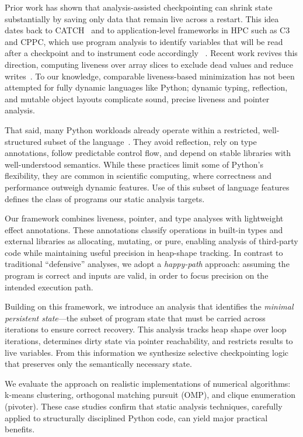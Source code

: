 Prior work has shown that analysis-assisted checkpointing can shrink state substantially by saving only data that remain live across a restart. This idea dates back to CATCH~\cite{li1990catch} and to application-level frameworks in HPC such as C3 and CPPC, which use program analysis to identify variables that will be read after a checkpoint and to instrument code accordingly ~\cite{bronevetsky2004application,rodriguez2010cppc}. Recent work revives this direction, computing liveness over array slices to exclude dead values and reduce writes~\cite{kim2024lact}. To our knowledge, comparable liveness-based minimization has not been attempted for fully dynamic languages like Python; dynamic typing, reflection, and mutable object layouts complicate sound, precise liveness and pointer analysis.

That said, many Python workloads already operate within a restricted, well-structured subset of the language~\cite{bence2021unambiguity}. They avoid reflection, rely on type annotations, follow predictable control flow, and depend on stable libraries with well-understood semantics. While these practices limit some of Python’s flexibility, they are common in scientific computing, where correctness and performance outweigh dynamic features. Use of this subset of language features defines the class of programs our static analysis targets.

Our framework combines liveness, pointer, and type analyses with lightweight effect annotations. These annotations classify operations in built-in types and external libraries as allocating, mutating, or pure, enabling analysis of third-party code while maintaining useful precision in heap-shape tracking. In contrast to traditional ``defensive'' analyses, we adopt a \emph{happy-path} approach: assuming the program is correct and inputs are valid, in order to focus precision on the intended execution path.

Building on this framework, we introduce an analysis that identifies the \emph{minimal persistent state}—the subset of program state that must be carried across iterations to ensure correct recovery. This analysis tracks heap shape over loop iterations, determines dirty state via pointer reachability, and restricts results to live variables. From this information we synthesize selective checkpointing logic that preserves only the semantically necessary state.

We evaluate the approach on realistic implementations of numerical algorithms: k-means clustering, orthogonal matching pursuit (OMP), and clique enumeration (pivoter). These case studies confirm that static analysis techniques, carefully applied to structurally disciplined Python code, can yield major practical benefits.


